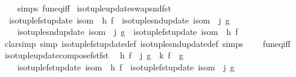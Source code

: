 \begin{isabellebody}
\ \ \ \ simps\ fun{\isacharunderscore}{\kern0pt}eq{\isacharunderscore}{\kern0pt}iff{\isacharparenright}{\kern0pt}%
\endisatagproof
{\isafoldproof}%
%
\isadelimproof
\isanewline
%
\endisadelimproof
\isanewline
{}\isamarkupfalse%
\ iso{\isacharunderscore}{\kern0pt}tuple{\isacharunderscore}{\kern0pt}update{\isacharunderscore}{\kern0pt}swap{\isacharunderscore}{\kern0pt}snd{\isacharunderscore}{\kern0pt}fst{\isacharcolon}{\kern0pt}\isanewline
\ \ {\isachardoublequoteopen}{\isacharparenleft}{\kern0pt}iso{\isacharunderscore}{\kern0pt}tuple{\isacharunderscore}{\kern0pt}fst{\isacharunderscore}{\kern0pt}update\ isom\ {\isasymcirc}\ h{\isacharparenright}{\kern0pt}\ f\ {\isasymcirc}\ {\isacharparenleft}{\kern0pt}iso{\isacharunderscore}{\kern0pt}tuple{\isacharunderscore}{\kern0pt}snd{\isacharunderscore}{\kern0pt}update\ isom\ {\isasymcirc}\ j{\isacharparenright}{\kern0pt}\ g\ {\isacharequal}{\kern0pt}\isanewline
\ \ \ \ {\isacharparenleft}{\kern0pt}iso{\isacharunderscore}{\kern0pt}tuple{\isacharunderscore}{\kern0pt}snd{\isacharunderscore}{\kern0pt}update\ isom\ {\isasymcirc}\ j{\isacharparenright}{\kern0pt}\ g\ {\isasymcirc}\ {\isacharparenleft}{\kern0pt}iso{\isacharunderscore}{\kern0pt}tuple{\isacharunderscore}{\kern0pt}fst{\isacharunderscore}{\kern0pt}update\ isom\ {\isasymcirc}\ h{\isacharparenright}{\kern0pt}\ f{\isachardoublequoteclose}\isanewline
%
\isadelimproof
\ \ %
\endisadelimproof
%
\isatagproof
{}\isamarkupfalse%
\ {\isacharparenleft}{\kern0pt}clarsimp\ simp{\isacharcolon}{\kern0pt}\ iso{\isacharunderscore}{\kern0pt}tuple{\isacharunderscore}{\kern0pt}fst{\isacharunderscore}{\kern0pt}update{\isacharunderscore}{\kern0pt}def\ iso{\isacharunderscore}{\kern0pt}tuple{\isacharunderscore}{\kern0pt}snd{\isacharunderscore}{\kern0pt}update{\isacharunderscore}{\kern0pt}def\ simps\isanewline
\ \ \ \ fun{\isacharunderscore}{\kern0pt}eq{\isacharunderscore}{\kern0pt}iff{\isacharparenright}{\kern0pt}%
\endisatagproof
{\isafoldproof}%
%
\isadelimproof
\isanewline
%
\endisadelimproof
\isanewline
{}\isamarkupfalse%
\ iso{\isacharunderscore}{\kern0pt}tuple{\isacharunderscore}{\kern0pt}update{\isacharunderscore}{\kern0pt}compose{\isacharunderscore}{\kern0pt}fst{\isacharunderscore}{\kern0pt}fst{\isacharcolon}{\kern0pt}\isanewline
\ \ {\isachardoublequoteopen}h\ f\ {\isasymcirc}\ j\ g\ {\isacharequal}{\kern0pt}\ k\ {\isacharparenleft}{\kern0pt}f\ {\isasymcirc}\ g{\isacharparenright}{\kern0pt}\ {\isasymLongrightarrow}\isanewline
\ \ \ \ {\isacharparenleft}{\kern0pt}iso{\isacharunderscore}{\kern0pt}tuple{\isacharunderscore}{\kern0pt}fst{\isacharunderscore}{\kern0pt}update\ isom\ {\isasymcirc}\ h{\isacharparenright}{\kern0pt}\ f\ {\isasymcirc}\ {\isacharparenleft}{\kern0pt}iso{\isacharunderscore}{\kern0pt}tuple{\isacharunderscore}{\kern0pt}fst{\isacharunderscore}{\kern0pt}update\ isom\ {\isasymcirc}\ j{\isacharparenright}{\kern0pt}\ g\ {\isacharequal}{\kern0pt}\isanewline

\end{isabellebody}

